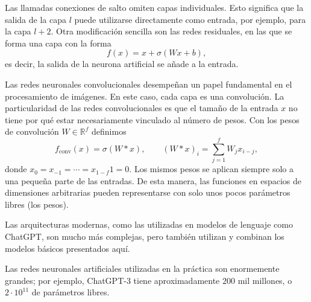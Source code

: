 \begin{frame}
    Las llamadas conexiones de salto omiten capas individuales.
    Esto significa que la salida de la capa $l$ puede utilizarse
    directamente como entrada, por ejemplo, para la capa $l+2$.
    Otra modificación sencilla son las \alert{redes residuales}, en
    las que se forma una capa con la forma
    \begin{equation*}
        f\left(x\right)=
        x+
        \sigma\left(Wx+b\right),
    \end{equation*}
    es decir, la salida de la neurona artificial se añade a la
    entrada.

    Las \alert{redes neuronales convolucionales} desempeñan un papel
    fundamental en el procesamiento de imágenes.
    En este caso, cada \alert{capa} es una convolución.
    La particularidad de las redes convolucionales es que el tamaño de
    la entrada $x$ no tiene por qué estar necesariamente vinculado al
    número de pesos.
    Con los pesos de convolución $W\in\mathbb{R}^{f}$ definimos
    \begin{equation*}
        f_{\text{conv}}\left(x\right)=
        \sigma\left(W\ast x\right),\qquad
        {\left(W\ast x\right)}_{i}=
        \sum_{j=1}^{f}
        W_{j}x_{i-j},
    \end{equation*}
    donde $x_{0}=x_{-1}=\cdots=x_{1-f}1=0$.
    Los mismos pesos se aplican siempre solo a una pequeña parte de
    las entradas.
    De esta manera, las funciones en espacios de dimensiones
    arbitrarias pueden representarse con solo unos pocos parámetros
    libres (los pesos).

    Las arquitecturas modernas, como las utilizadas en modelos de
    lenguaje como ChatGPT, son mucho más complejas, pero también
    utilizan y combinan los modelos básicos presentados aquí.

    Las redes neuronales artificiales utilizadas en la práctica son
    enormemente grandes; por ejemplo, ChatGPT-3 tiene aproximadamente
    $200$ mil millones, o $2\cdot 10^{11}$ de parámetros libres.
\end{frame}

